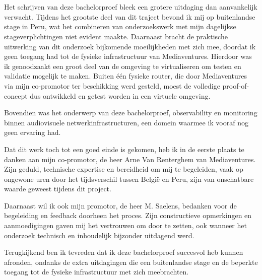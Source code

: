 
\chapter*{}%
\label{ch:voorwoord}

Het schrijven van deze bachelorproef bleek een grotere uitdaging dan aanvankelijk verwacht. Tijdens het grootste deel van dit traject bevond ik mij op buitenlandse stage in Peru, wat het combineren van onderzoekswerk met mijn dagelijkse stageverplichtingen niet evident maakte. Daarnaast bracht de praktische uitwerking van dit onderzoek bijkomende moeilijkheden met zich mee, doordat ik geen toegang had tot de fysieke infrastructuur van Mediaventures. Hierdoor was ik genoodzaakt een groot deel van de omgeving te virtualiseren om testen en validatie mogelijk te maken. Buiten één fysieke router, die door Mediaventures via mijn co-promotor ter beschikking werd gesteld, moest de volledige proof-of-concept dus ontwikkeld en getest worden in een virtuele omgeving.

Bovendien was het onderwerp van deze bachelorproef, observability en monitoring binnen audiovisuele netwerkinfrastructuren, een domein waarmee ik vooraf nog geen ervaring had.


Dat dit werk toch tot een goed einde is gekomen, heb ik in de eerste plaats te danken aan mijn co-promotor, de heer Arne Van Renterghem van Mediaventures. Zijn geduld, technische expertise en bereidheid om mij te begeleiden, vaak op ongewone uren door het tijdsverschil tussen België en Peru, zijn van onschatbare waarde geweest tijdens dit project.

Daarnaast wil ik ook mijn promotor, de heer M. Saelens, bedanken voor de begeleiding en feedback doorheen het proces. Zijn constructieve opmerkingen en aanmoedigingen gaven mij het vertrouwen om door te zetten, ook wanneer het onderzoek technisch en inhoudelijk bijzonder uitdagend werd.

Terugkijkend ben ik tevreden dat ik deze bachelorproef succesvol heb kunnen afronden, ondanks de extra uitdagingen die een buitenlandse stage en de beperkte toegang tot de fysieke infrastructuur met zich meebrachten.